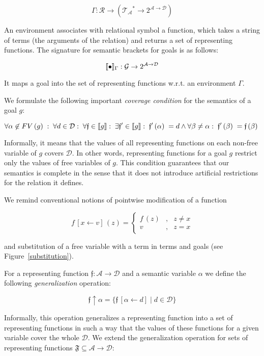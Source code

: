 \[
  \Gamma : \mathcal{R} \to (\mathcal{T_A}^*\to 2^{\mathcal{A}\to\mathcal{D}})
\]

An environment associates with relational symbol a function, which takes a string of terms (the arguments of the relation) and returns a set of
representing functions. The signature for semantic brackets for goals is as follows:

\[
\llbracket{\bullet}\rrbracket_{\Gamma} : \mathcal{G}\to 2^{\mathcal{A}\to\mathcal{D}}
\]

It maps a goal into the set of representing functions w.r.t. an environment $\Gamma$.

We formulate the following important \emph{coverage condition} for the semantics of a goal $g$:

\[
\forall\alpha\not\in FV\,(g)\; :\; \forall d \in \mathcal{D}:\; \forall\mathfrak{f} \in \llbracket{g}\rrbracket:\; \exists \mathfrak{f'} \in \llbracket{g}\rrbracket :\; \mathfrak{f'}\,(\alpha)\; = d \wedge \forall \beta \neq \alpha:\; \mathfrak{f'}\,(\beta)\; = \mathfrak{f}\,(\beta)\; 
\]

Informally, it means that the values of all representing functions on each non-free variable of $g$ covers $\mathcal{D}$. In other words, representing
functions for a goal $g$ restrict only the values of free variables of $g$. This condition guarantees that our semantics is complete in the sense that
it does not introduce artificial restrictions for the relation it defines.

We remind conventional notions of pointwise modification of a function

\[
f\,[x\gets v]\,(z)=\left\{
\begin{array}{rcl}
  f\,(z) &,& z \ne x \\
  v      &,& z = x
\end{array}
\right.
\]

and substitution of a free variable with a term in terms and goals (see Figure~\ref{substitution}).

For a representing function $\mathfrak{f}:\mathcal{A}\to\mathcal{D}$ and a semantic variable $\alpha$ we define
the following \emph{generalization} operation:

\[
\mathfrak{f}\uparrow\alpha = \{ \mathfrak{f}\,[\alpha\gets d] \mid d\in\mathcal D\}
\]

Informally, this operation generalizes a representing function into a set of representing functions in such a way that the
values of these functions for a given variable cover the whole $\mathcal{D}$. We extend the generalization operation for sets of
representing functions $\mathfrak{F}\subseteq\mathcal{A}\to\mathcal{D}$:

